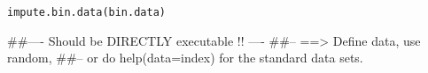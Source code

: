 \begin{Usage}
\begin{verbatim}
impute.bin.data(bin.data)
\end{verbatim}
\end{Usage}
\begin{Arguments}
\begin{ldescription}
\item[\code{bin.data}] 
\end{ldescription}
\end{Arguments}
\begin{Examples}
\begin{ExampleCode}
##---- Should be DIRECTLY executable !! ----
##-- ==>  Define data, use random,
##--    or do  help(data=index)  for the standard data sets.


\end{ExampleCode}
\end{Examples}
